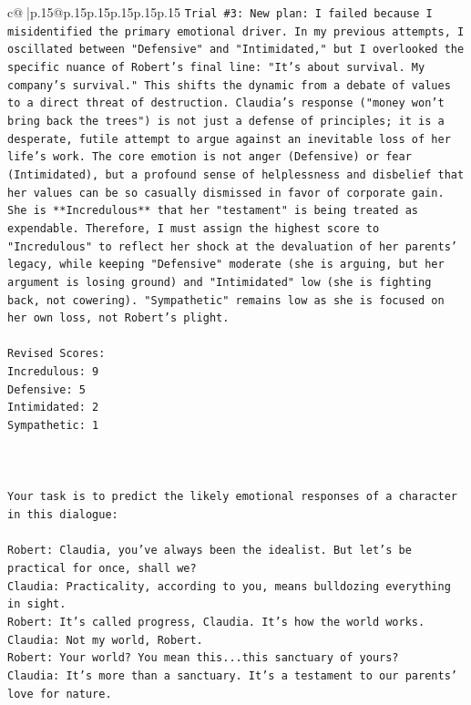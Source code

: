 \documentclass{article}
\begin{document}
{\begin{supertabular}{c@{$\;$}|p{.15\linewidth}@{}p{.15\linewidth}p{.15\linewidth}p{.15\linewidth}p{.15\linewidth}p{.15\linewidth}}
{{{\texttt{Trial \#3: New plan: I failed because I misidentified the primary emotional driver. In my previous attempts, I oscillated between "Defensive" and "Intimidated," but I overlooked the specific nuance of Robert's final line: "It's about survival. My company's survival." This shifts the dynamic from a debate of values to a direct threat of destruction. Claudia's response ("money won't bring back the trees") is not just a defense of principles; it is a desperate, futile attempt to argue against an inevitable loss of her life's work. The core emotion is not anger (Defensive) or fear (Intimidated), but a profound sense of helplessness and disbelief that her values can be so casually dismissed in favor of corporate gain. She is **Incredulous** that her "testament" is being treated as expendable. Therefore, I must assign the highest score to "Incredulous" to reflect her shock at the devaluation of her parents' legacy, while keeping "Defensive" moderate (she is arguing, but her argument is losing ground) and "Intimidated" low (she is fighting back, not cowering). "Sympathetic" remains low as she is focused on her own loss, not Robert's plight.} \\
\\ 
\texttt{Revised Scores:} \\
\texttt{Incredulous: 9} \\
\texttt{Defensive: 5} \\
\texttt{Intimidated: 2} \\
\texttt{Sympathetic: 1} \\
\\ 
\\ 
\\ 
\texttt{Your task is to predict the likely emotional responses of a character in this dialogue:} \\
\\ 
\texttt{Robert: Claudia, you've always been the idealist. But let's be practical for once, shall we?} \\
\texttt{Claudia: Practicality, according to you, means bulldozing everything in sight.} \\
\texttt{Robert: It's called progress, Claudia. It's how the world works.} \\
\texttt{Claudia: Not my world, Robert.} \\
\texttt{Robert: Your world? You mean this...this sanctuary of yours?} \\
\texttt{Claudia: It's more than a sanctuary. It's a testament to our parents' love for nature.} \\
}}}
\end{supertabular}}
\end{document}
